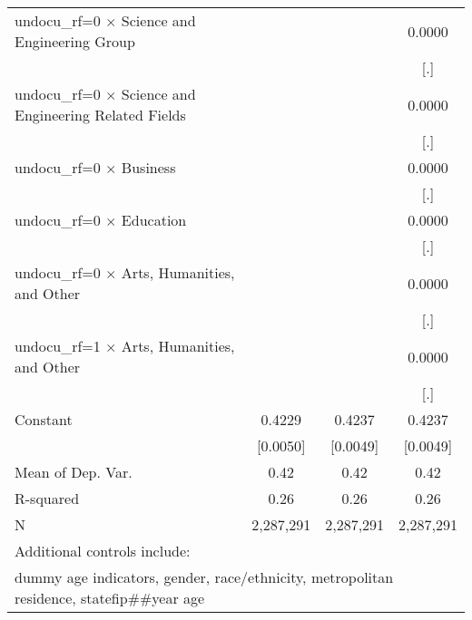 \begin{table}[htbp]
\begin{tabular}{l*{3}{c}}
\addlinespace
undocu\_rf=0 $\times$ Science and Engineering Group&                     &                     &      0.0000         \\
                    &                     &                     &         [.]         \\
\addlinespace
undocu\_rf=0 $\times$ Science and Engineering Related Fields&                     &                     &      0.0000         \\
                    &                     &                     &         [.]         \\
\addlinespace
undocu\_rf=0 $\times$ Business&                     &                     &      0.0000         \\
                    &                     &                     &         [.]         \\
\addlinespace
undocu\_rf=0 $\times$ Education&                     &                     &      0.0000         \\
                    &                     &                     &         [.]         \\
\addlinespace
undocu\_rf=0 $\times$ Arts, Humanities, and Other&                     &                     &      0.0000         \\
                    &                     &                     &         [.]         \\
\addlinespace
undocu\_rf=1 $\times$ Arts, Humanities, and Other&                     &                     &      0.0000         \\
                    &                     &                     &         [.]         \\
\addlinespace
Constant            &      0.4229\sym{***}&      0.4237\sym{***}&      0.4237\sym{***}\\
                    &    [0.0050]         &    [0.0049]         &    [0.0049]         \\
\midrule
Mean of Dep. Var.   &        0.42         &        0.42         &        0.42         \\
R-squared           &        0.26         &        0.26         &        0.26         \\
N                   &   2,287,291         &   2,287,291         &   2,287,291         \\
\bottomrule
\multicolumn{4}{l}{\footnotesize Additional controls include:}\\
\multicolumn{4}{l}{\footnotesize dummy age indicators, gender, race/ethnicity, metropolitan residence, statefip##year age}\\

\end{tabular}
\end{table}

